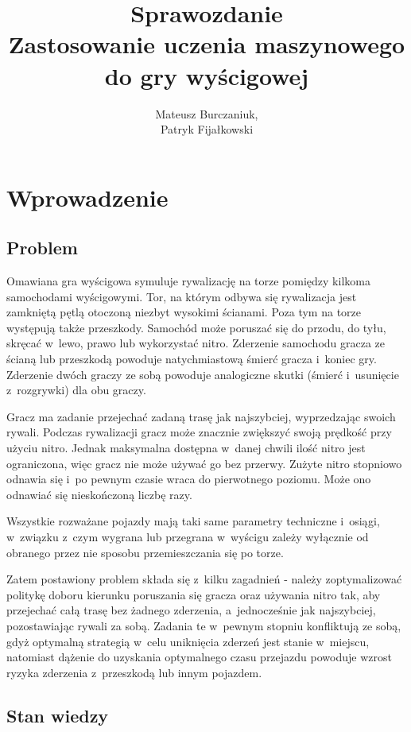 \documentclass[a4paper,12pt]{article}
\title{Sprawozdanie \\
\Large Zastosowanie uczenia maszynowego do gry wyścigowej}
\author{Mateusz Burczaniuk,\\ Patryk Fijałkowski}
\let\oldsection\section
\renewcommand\section{\clearpage\oldsection}
\begin{document}
	\maketitle
	\tableofcontents

\section{Wprowadzenie}
\subsection{Problem}
Omawiana gra wyścigowa symuluje rywalizację na torze pomiędzy kilkoma samochodami wyścigowymi. Tor, na którym odbywa się rywalizacja jest zamkniętą pętlą otoczoną niezbyt wysokimi ścianami. Poza tym na torze występują także przeszkody. Samochód może poruszać się do przodu, do tyłu, skręcać w~lewo, prawo lub wykorzystać nitro. Zderzenie samochodu gracza ze ścianą lub przeszkodą powoduje natychmiastową śmierć gracza i~koniec gry. Zderzenie dwóch graczy ze sobą powoduje analogiczne skutki (śmierć i~usunięcie z~rozgrywki) dla obu graczy.

Gracz ma zadanie przejechać zadaną trasę jak najszybciej, wyprzedzając swoich rywali. Podczas rywalizacji gracz może znacznie zwiększyć swoją prędkość przy użyciu nitro. Jednak maksymalna dostępna w~danej chwili ilość nitro jest ograniczona, więc gracz nie może używać go bez przerwy. Zużyte nitro stopniowo odnawia się i~po pewnym czasie wraca do pierwotnego poziomu. Może ono odnawiać się nieskończoną liczbę razy.

Wszystkie rozważane pojazdy mają taki same parametry techniczne i~osiągi, w~związku z~czym wygrana lub przegrana w~wyścigu zależy wyłącznie od obranego przez nie sposobu przemieszczania się po torze.

Zatem postawiony problem składa się z~kilku zagadnień - należy zoptymalizować politykę doboru kierunku poruszania się gracza oraz używania nitro tak, aby przejechać całą trasę bez żadnego zderzenia, a~jednocześnie jak najszybciej, pozostawiając rywali za sobą. Zadania te w~pewnym stopniu konfliktują ze sobą, gdyż optymalną strategią w~celu uniknięcia zderzeń jest stanie w~miejscu, natomiast dążenie do uzyskania optymalnego czasu przejazdu powoduje wzrost ryzyka zderzenia z~przeszkodą lub innym pojazdem.


\subsection{Stan wiedzy}
\end{document}
